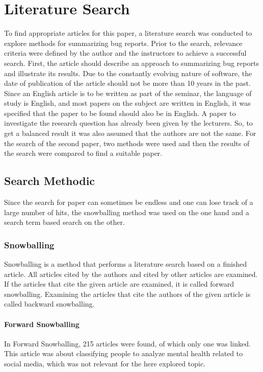 \documentclass[a4paper,10pt, bibliography=totocnumbered]{scrreprt}
\begin{document}
\chapter{Literature Search}
\label{literatur}
			
To find appropriate articles for this paper, a literature search was conducted to explore methods for summarizing bug reports. Prior to the search, relevance criteria were defined by the author and the instructors to achieve a successful search. First, the article should describe an approach to summarizing bug reports and illustrate its results. Due to the constantly evolving nature of software, the date of publication of the article should not be more than 10 years in the past. Since an English article is to be written as part of the seminar, the language of study is English, and most papers on the subject are written in English, it was specified that the paper to be found should also be in English. A paper to investigate the research question has already been given by the lecturers. So, to get a balanced result it was also assumed that the authors are not the same. For the search of the second paper, two methods were used and then the results of the search were compared to find a suitable paper.
\section{Search Methodic}
Since the search for paper can sometimes be endless and one can lose track of a large number of hits, the snowballing method was used on the one hand and a search term based search on the other. 
\subsection{Snowballing}
Snowballing is a method that performs a literature search based on a finished article. All articles cited by the authors and cited by other articles are examined. If the articles that cite the given article are examined, it is called forward snowballing. Examining the articles that cite the authors of the given article is called backward snowballing.
\subsubsection{Forward Snowballing}
In Forward Snowballing, 215 articles were found, of which only one was linked. This article was about classifying people to analyze mental health related to social media, which was not relevant for the here explored topic.
\end{document}
